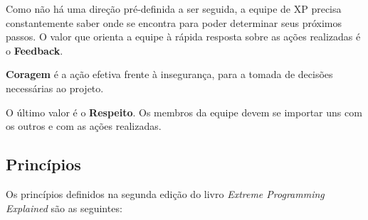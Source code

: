 \documentclass[a4paper,12pt,font=plain,header=plain]{abnt}
\begin{document}
      Como não há uma direção pré-definida a ser seguida, a equipe de XP precisa constantemente saber onde se encontra para poder determinar seus próximos passos. O valor que orienta a equipe à rápida resposta sobre as ações realizadas é o \textbf{Feedback}.

      \textbf{Coragem} é a ação efetiva frente à insegurança, para a tomada de decisões necessárias ao projeto.

      O último valor é o \textbf{Respeito}. Os membros da equipe devem se importar uns com os outros e com as ações realizadas.

    \subsection{Princípios}

      Os princípios definidos na segunda edição do livro \textit{Extreme Programming Explained}\cite{beck04} são as seguintes:
\end{document}
